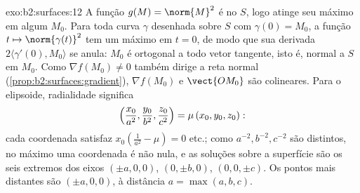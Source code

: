 \begin{solution}{exo:b2:surfaces:12}
A função $g(M) = \norm{M}^2$ é  no 
$S$, logo atinge seu máximo em algum $M_0$. Para toda curva
$\gamma$ desenhada sobre $S$ com $\gamma(0) = M_0$, a função $t
\mapsto \norm{\gamma(t)}^2$ tem um máximo em $t = 0$, de modo que sua
derivada $2\langle\gamma'(0), M_0\rangle$ se anula: $M_0$ é
ortogonal a todo vetor tangente, isto é, normal a $S$ em
$M_0$. Como $\nabla f(M_0) \neq 0$ também dirige a reta normal
(\cref{prop:b2:surfaces:gradient}), $\nabla f(M_0)$ e
$\vect{OM_0}$ são colineares. Para o elipsoide, radialidade
significa
\[
\Bigl(\frac{x_0}{a^2}, \frac{y_0}{b^2},
\frac{z_0}{c^2}\Bigr) = \mu\,(x_0, y_0, z_0) :
\]
cada coordenada satisfaz $x_0(\frac1{a^2} - \mu) = 0$ etc.;
como $a^{-2}, b^{-2}, c^{-2}$ são distintos, no máximo uma
coordenada é não nula, e as soluções sobre a superfície são
os seis extremos dos eixos $(\pm a, 0, 0)$, $(0, \pm b, 0)$, $(0,
0, \pm c)$. Os pontos mais distantes são $(\pm a, 0, 0)$, à
distância $a = \max(a,b,c)$.
\end{solution}

